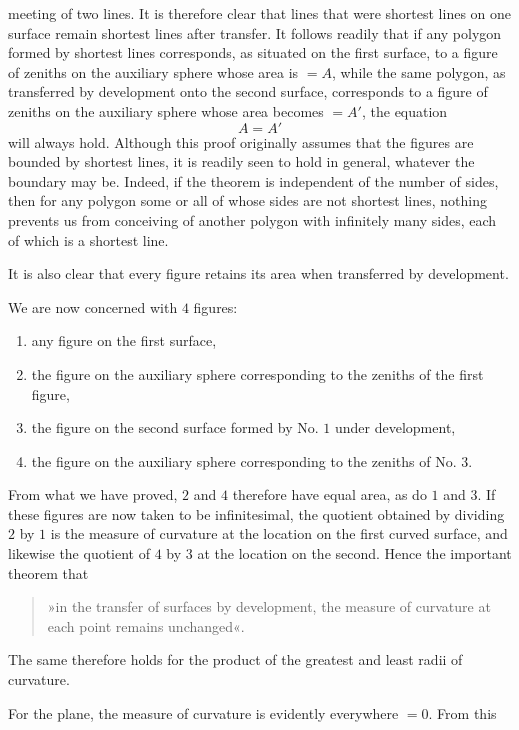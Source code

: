 %
meeting of two lines. It is therefore clear that lines that were shortest lines on one surface remain shortest lines after transfer. It follows readily that if any polygon formed by shortest lines corresponds, as situated on the first surface, to a figure of zeniths on the auxiliary sphere whose area is $=A$, while the same polygon, as transferred by development onto the second surface, corresponds to a figure of zeniths on the auxiliary sphere whose area becomes $=A'$, the equation
\[
A=A'
\]
will always hold. Although this proof originally assumes that the figures are bounded by shortest lines, it is readily seen to hold in general, whatever the boundary may be. Indeed, if the theorem is independent of the number of sides, then for any polygon some or all of whose sides are not shortest lines, nothing prevents us from conceiving of another polygon with infinitely many sides, each of which is a shortest line.

It is also clear that every figure retains its area when transferred by development.

We are now concerned with $4$ figures:
\begin{enumerate}
\item[1)] any figure on the first surface,
\item[2)] the figure on the auxiliary sphere corresponding to the zeniths of the first figure,
\item[3)] the figure on the second surface formed by No. $1$ under development,
\item[4)] the figure on the auxiliary sphere corresponding to the zeniths of No. $3$.
\end{enumerate}
\noindent\hspace*{1.2em}From what we have proved, $2$ and $4$ therefore have equal area, as do $1$ and $3$. If these figures are now taken to be infinitesimal, the quotient obtained by dividing $2$ by $1$ is the measure of curvature at the location on the first curved surface, and likewise the quotient of $4$ by $3$ at the location on the second. Hence the important theorem that
\begin{quote}
»in the transfer of surfaces by development, the measure of curvature at each point remains unchanged«.
\end{quote}
\noindent The same therefore holds for the product of the greatest and least radii of curvature.

For the plane, the measure of curvature is evidently everywhere $=0$. From this
